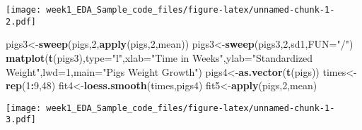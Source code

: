 \documentclass[]{article}
\newenvironment{Shaded}{\begin{snugshade}}{\end{snugshade}}
\newcommand{\DataTypeTok}[1]{\textcolor[rgb]{0.13,0.29,0.53}{#1}}
\newcommand{\DecValTok}[1]{\textcolor[rgb]{0.00,0.00,0.81}{#1}}
\newcommand{\KeywordTok}[1]{\textcolor[rgb]{0.13,0.29,0.53}{\textbf{#1}}}
\newcommand{\NormalTok}[1]{#1}
\newcommand{\OperatorTok}[1]{\textcolor[rgb]{0.81,0.36,0.00}{\textbf{#1}}}
\newcommand{\StringTok}[1]{\textcolor[rgb]{0.31,0.60,0.02}{#1}}
\begin{document}
\texttt{[image: week1\_EDA\_Sample\_code\_files/figure-latex/unnamed-chunk-1-2.pdf]}

\begin{Shaded}
\begin{Highlighting}[]
\NormalTok{pigs3<-}\KeywordTok{sweep}\NormalTok{(pigs,}\DecValTok{2}\NormalTok{,}\KeywordTok{apply}\NormalTok{(pigs,}\DecValTok{2}\NormalTok{,mean))}
\NormalTok{pigs3<-}\KeywordTok{sweep}\NormalTok{(pigs3,}\DecValTok{2}\NormalTok{,sd1,}\DataTypeTok{FUN=}\StringTok{"/"}\NormalTok{)}
\KeywordTok{matplot}\NormalTok{(}\KeywordTok{t}\NormalTok{(pigs3),}\DataTypeTok{type=}\StringTok{"l"}\NormalTok{,}\DataTypeTok{xlab=}\StringTok{"Time in Weeks"}\NormalTok{,}\DataTypeTok{ylab=}\StringTok{"Standardized Weight"}\NormalTok{,}\DataTypeTok{lwd=}\DecValTok{1}\NormalTok{,}\DataTypeTok{main=}\StringTok{"Pigs Weight Growth"}\NormalTok{)}
\NormalTok{pigs4<-}\KeywordTok{as.vector}\NormalTok{(}\KeywordTok{t}\NormalTok{(pigs))}
\NormalTok{times<-}\KeywordTok{rep}\NormalTok{(}\DecValTok{1}\OperatorTok{:}\DecValTok{9}\NormalTok{,}\DecValTok{48}\NormalTok{)}
\NormalTok{fit4<-}\KeywordTok{loess.smooth}\NormalTok{(times,pigs4)}
\NormalTok{fit5<-}\KeywordTok{apply}\NormalTok{(pigs,}\DecValTok{2}\NormalTok{,mean)}
\end{Highlighting}
\end{Shaded}

\texttt{[image: week1\_EDA\_Sample\_code\_files/figure-latex/unnamed-chunk-1-3.pdf]}
\end{document}
